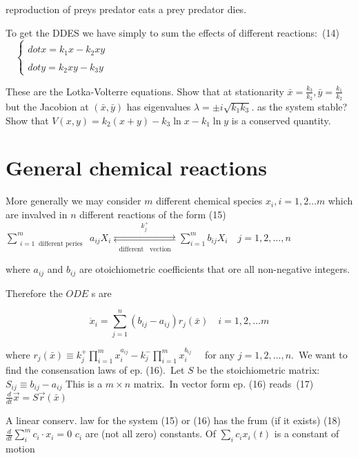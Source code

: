 reproduction of preys predator eats a prey predator dies.

To get the DDES we have simply to sum the effects of different reactions:\
(14) $\quad\left\{\begin{array}{l}\\dot{x}=k_{1} x-k_{2} x y \\
\\dot{y}=k_{2} x y-k_{3} y
\end{array}\right.$

These are the Lotka-Volterre equations. Show that at stationarity $\bar{x}=\frac{k_{3}}{k_{2}}, \bar{y}=\frac{k_{1}}{k_{2}}$ but the Jacobion at $(\bar{x}, \bar{y})$ has eigenvalues $\lambda= \pm i \sqrt{k_{1} k_{3}}$. as the system stable? Show that $V(x, y)=k_{2}(x+y)-k_{3} \ln x-k_{1} \ln y$ is a conserved quantity.

\section*{General chemical reactions}
More generally we may consider $m$ different chemical species $x_{i}, i=1, 2 \ldots m$ which are invalved in $n$ different reactions of the form
\n(15) $\sum_{\substack{i=1 \ \text { different peries }}}^{m} a_{i j} X_{i} \underset{\substack{\text { different } \ \text { vection }}}{\stackrel{k_{j}^{+}}{\rightleftarrows}} \sum_{i=1}^{m} b_{i j} X_{i} \quad j=1, 2, \ldots, n$

where $a_{i j}$ and $b_{i j}$ are otoichiometric coefficients that ore all non-negative integers.

Therefore the $O D E$ s are


\begin{equation*}
\dot{x}_{i}=\sum_{j=1}^{n}\left(b_{i j}-a_{i j}\right) r_{j}(\bar{x}) \quad i=1, 2, \ldots m \tag{16}
\end{equation*} 


where $r_{j}(\bar{x}) \equiv k_{j}^{+} \prod_{i=1}^{m} x_{i}^{a_{i j}}-k_{j}^{-} \prod_{i=1}^{m} x_{i}^{b_{i j}} \quad$ for any $j=1, 2, \ldots, n$.\
We want to find the consensation laws of ep. (16).\
Let $S$ be the stoichiometric matrix: $S_{i j} \equiv b_{i j}-a_{i j}$ This is a $m \times n$ matrix.\
In vector form ep. (16) reads\
(17) $\frac{d}{d t} \vec{x}=S \vec{r}(\bar{x})$

A linear conserv. law for the system (15) or (16) has the frum (if it exists)
\n(18) $\frac{d}{d t} \sum_{i}^{m} c_{i} \cdot x_{i}=0$
\nwhere $c_{i}$ are (not all zero) constants. Of $\sum_{i} c_{i} x_{i}(t)$ is a constant of motion

